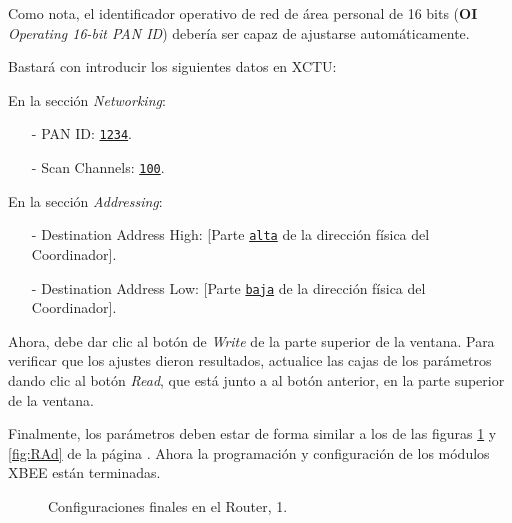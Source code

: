 Como nota, el identificador operativo de red de área personal de 16 bits (\textbf{OI} \textit{Operating 16-bit PAN ID}) debería ser capaz de ajustarse automáticamente\footnotemark.


Bastará con introducir los siguientes datos en XCTU: 

En la sección \textit{Networking}:
\begin{itemize}
	\item[-] PAN ID: \texttt{\underline{1234}}.
	\item[-] Scan Channels: \texttt{\underline{100}}.
\end{itemize}

En la sección \textit{Addressing}:
\begin{itemize}
	\item[-] Destination Address High: [Parte \texttt{\underline{alta}} de la dirección física del 
	Coordinador].
	\item[-] Destination Address Low: [Parte \texttt{\underline{baja}} de la dirección física del 
	Coordinador].
\end{itemize}

Ahora, debe dar clic al botón de \textit{Write} de la parte superior de la ventana. Para verificar que los ajustes dieron resultados, actualice las cajas de los parámetros dando clic al botón \textit{Read}, que está junto a al botón anterior, en la parte superior de la ventana.

Finalmente, los parámetros deben estar de forma similar a los de las figuras \ref{fig:RNet} y \ref{fig:RAd} de la página \pageref{fig:RNet}. Ahora la programación y configuración de los módulos XBEE están terminadas.

\begin{figure}[H] %
\caption[1]{Configuraciones finales en el Router, 1.}
\label{fig:RNet}
\end{figure}

